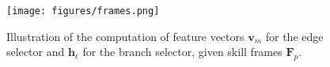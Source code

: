 

\begin{figure}[t!]
    \centering
    \texttt{[image: figures/frames.png]}
    \caption{Illustration of the computation of feature vectors $\mathbf{v}_m$ for the edge selector and $\mathbf{h}_\ell$ for the branch selector, given skill frames $\mathbf{F}_p$.}
    \label{fig:frames}
    \vspace{-0.15cm}
\end{figure}


